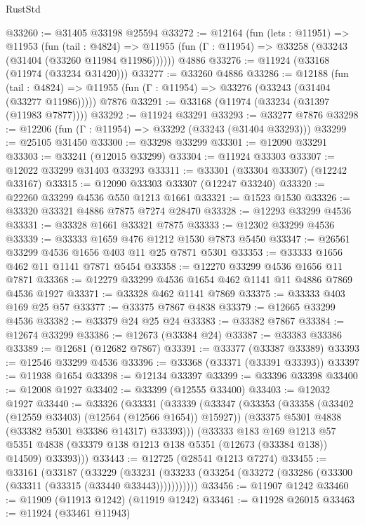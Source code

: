 \begin{lexlean}{RustStd}
\begin{coremodule}
@33260 := @31405 @33198 @25594
@33272 := @12164
    (fun (lets : @11951) =>
    @11953
      (fun (tail : @4824) =>
      @11955 (fun (Γ : @11954) => @33258 (@33243 (@31404 (@33260 @11984 @11986))))))
    @4886
@33276 := @11924 (@33168 (@11974 (@33234 @31420)))
@33277 := @33260 @4886
@33286 := @12188
    (fun (tail : @4824) => @11955 (fun (Γ : @11954) => @33276 (@33243 (@31404 (@33277 @11986)))))
    @7876
@33291 := @33168 (@11974 (@33234 (@31397 (@11983 @7877))))
@33292 := @11924 @33291
@33293 := @33277 @7876
@33298 := @12206 (fun (Γ : @11954) => @33292 (@33243 (@31404 @33293)))
@33299 := @25105 @31450
@33300 := @33298 @33299
@33301 := @12090 @33291
@33303 := @33241 (@12015 @33299)
@33304 := @11924 @33303
@33307 := @12022 @33299 @31403 @33293
@33311 := @33301 (@33304 @33307) (@12242 @33167)
@33315 := @12090 @33303 @33307 (@12247 @33240)
@33320 := @22260 @33299 @4536 @550 @1213 @1661
@33321 := @1523 @1530
@33326 := @33320 @33321 @4886 @7875 @7274 @28470
@33328 := @12293 @33299 @4536
@33331 := @33328 @1661 @33321 @7875
@33333 := @12302 @33299 @4536
@33339 := @33333 @1659 @476 @1212 @1530 @7873 @5450
@33347 := @26561 @33299 @4536 @1656 @403 @11 @25 @7871 @5301
@33353 := @33333 @1656 @462 @11 @1141 @7871 @5454
@33358 := @12270 @33299 @4536 @1656 @11 @7871
@33368 := @12279 @33299 @4536 @1654 @462 @1141 @11 @4886 @7869 @4536 @1927
@33371 := @33328 @462 @1141 @7869
@33375 := @33333 @403 @169 @25 @57
@33377 := @33375 @7867 @4838
@33379 := @12665 @33299 @4536
@33382 := @33379 @24 @25 @24
@33383 := @33382 @7867
@33384 := @12674 @33299
@33386 := @12673 (@33384 @24)
@33387 := @33383 @33386
@33389 := @12681 (@12682 @7867)
@33391 := @33377 (@33387 @33389)
@33393 := @12546 @33299 @4536
@33396 := @33368 (@33371 (@33391 @33393))
@33397 := @11938 @1654
@33398 := @12134 @33397
@33399 := @33396 @33398
@33400 := @12008 @1927
@33402 := @33399 (@12555 @33400)
@33403 := @12032 @1927
@33440 := @33326
    (@33331
      (@33339
        (@33347
          (@33353
            (@33358 (@33402 (@12559 @33403) (@12564 (@12566 @1654)) @15927))
            (@33375 @5301 @4838 (@33382 @5301 @33386 @14317) @33393)))
        (@33333
          @183
          @169
          @1213
          @57
          @5351
          @4838
          (@33379 @138 @1213 @138 @5351 (@12673 (@33384 @138)) @14509)
          @33393)))
@33443 := @12725 (@28541 @1213 @7274)
@33455 := @33161
    (@33187
      (@33229
        (@33231 (@33233 (@33254 (@33272 (@33286 (@33300 (@33311 (@33315 (@33440 @33443)))))))))))
@33456 := @11907 @1242
@33460 := @11909 (@11913 @1242) (@11919 @1242)
@33461 := @11928 @26015
@33463 := @11924 (@33461 @11943)

\end{coremodule}
\end{lexlean}
